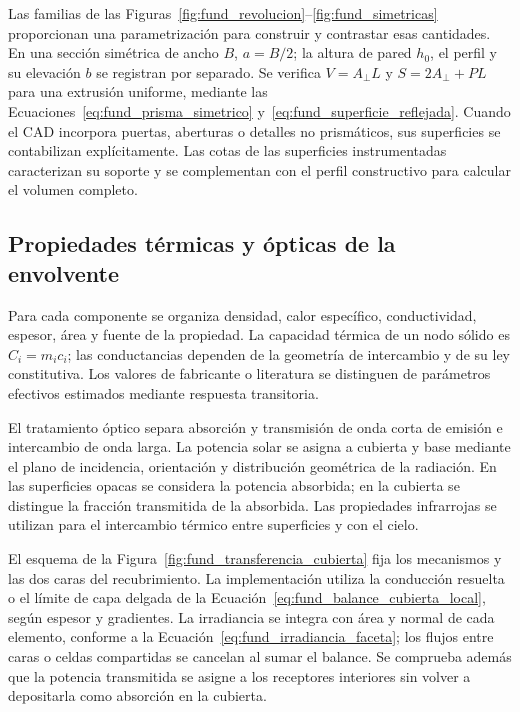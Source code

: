 Las familias de las Figuras~\ref{fig:fund_revolucion}--\ref{fig:fund_simetricas} proporcionan una parametrización para construir y contrastar esas cantidades. En una sección simétrica de ancho $B$, $a=B/2$; la altura de pared $h_0$, el perfil y su elevación $b$ se registran por separado. Se verifica $V=A_{\perp}L$ y $S=2A_{\perp}+PL$ para una extrusión uniforme, mediante las Ecuaciones~\eqref{eq:fund_prisma_simetrico} y~\eqref{eq:fund_superficie_reflejada}. Cuando el CAD incorpora puertas, aberturas o detalles no prismáticos, sus superficies se contabilizan explícitamente. Las cotas de las superficies instrumentadas caracterizan su soporte y se complementan con el perfil constructivo para calcular el volumen completo.

\subsection{Propiedades térmicas y ópticas de la envolvente}

Para cada componente se organiza densidad, calor específico, conductividad, espesor, área y fuente de la propiedad. La capacidad térmica de un nodo sólido es $C_i=m_ic_i$; las conductancias dependen de la geometría de intercambio y de su ley constitutiva. Los valores de fabricante o literatura se distinguen de parámetros efectivos estimados mediante respuesta transitoria.

El tratamiento óptico separa absorción y transmisión de onda corta de emisión e intercambio de onda larga. La potencia solar se asigna a cubierta y base mediante el plano de incidencia, orientación y distribución geométrica de la radiación. En las superficies opacas se considera la potencia absorbida; en la cubierta se distingue la fracción transmitida de la absorbida. Las propiedades infrarrojas se utilizan para el intercambio térmico entre superficies y con el cielo.

El esquema de la Figura~\ref{fig:fund_transferencia_cubierta} fija los mecanismos y las dos caras del recubrimiento. La implementación utiliza la conducción resuelta o el límite de capa delgada de la Ecuación~\eqref{eq:fund_balance_cubierta_local}, según espesor y gradientes. La irradiancia se integra con área y normal de cada elemento, conforme a la Ecuación~\eqref{eq:fund_irradiancia_faceta}; los flujos entre caras o celdas compartidas se cancelan al sumar el balance. Se comprueba además que la potencia transmitida se asigne a los receptores interiores sin volver a depositarla como absorción en la cubierta.

